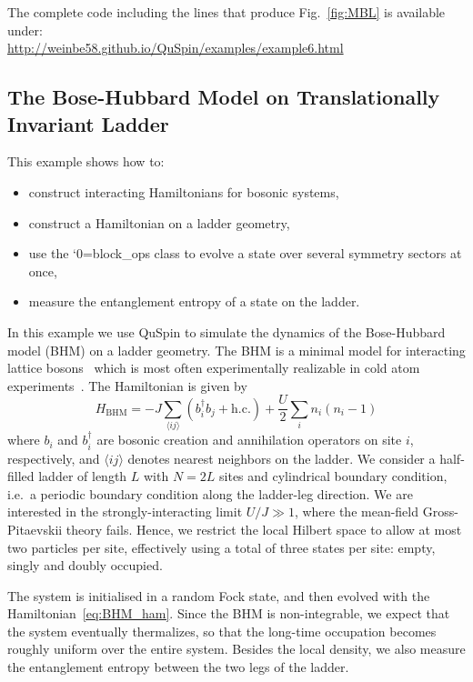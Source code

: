 \documentclass{SciPost}
\newcommand\0{\scalebox{-1}[1]{0}}
\let\svttfamily\ttfamily
\renewcommand\ttfamily{\svttfamily\catcode`0=\active }
\renewcommand\texttt{\bgroup\ttfamily\texttthelp}
\def\texttthelp#1{#1\egroup}
\begin{document}
The complete code including the lines that produce Fig.~\ref{fig:MBL} is available under:\\

\href{http://weinbe58.github.io/QuSpin/examples/example6.html}{http://weinbe58.github.io/QuSpin/examples/example6.html}\\

\subsection{The Bose-Hubbard Model on Translationally Invariant Ladder}
\label{subsec:Bose_Ladder}

This example shows how to:
\begin{itemize}
	\item construct interacting Hamiltonians for bosonic systems,
	\item construct a Hamiltonian on a ladder geometry,
	\item use the \texttt{block\_ops} class to evolve a state over several symmetry sectors at once,
	\item measure the entanglement entropy of a state on the ladder.
\end{itemize}

 In this example we use QuSpin to simulate the dynamics of the Bose-Hubbard model (BHM) on a ladder geometry. The BHM is a minimal model for interacting lattice bosons~\cite{sachdev_book} which is most often experimentally realizable in cold atom experiments~\cite{bloch_05}. The Hamiltonian is given by
\begin{equation}
	H_\mathrm{BHM} = -J\sum_{\langle ij\rangle} \left(b_i^\dagger b_j + \mathrm{h.c.}\right) + \frac{U}{2}\sum_{i}n_i(n_i-1)
	\label{eq:BHM_ham}
\end{equation} 
where $b_i$ and $b^\dagger_i$ are bosonic creation and annihilation operators on site $i$, respectively, and $\langle ij\rangle$ denotes nearest neighbors on the ladder. We consider a half-filled ladder of length $L$ with $N=2L$ sites and cylindrical boundary condition, i.e.~a periodic boundary condition along the ladder-leg direction. We are interested in the strongly-interacting limit $U/J\gg 1$, where the mean-field Gross-Pitaevskii theory fails. Hence, we restrict the local Hilbert space to allow at most two particles per site, effectively using a total of three states per site: empty, singly and doubly occupied.  

The system is initialised in a random Fock state, and then evolved with the Hamiltonian~\eqref{eq:BHM_ham}.  Since the BHM is non-integrable, we expect that the system eventually thermalizes, so that the long-time occupation becomes roughly uniform over the entire system. Besides the local density, we also measure the entanglement entropy between the two legs of the ladder.
\end{document}
